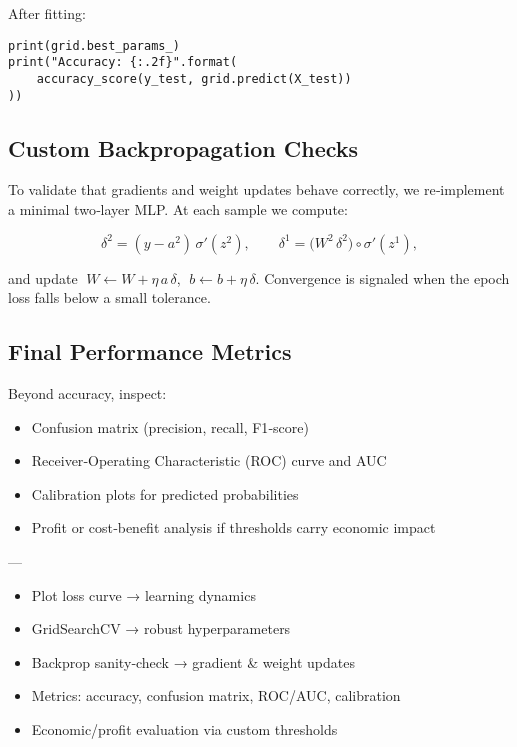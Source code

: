 After fitting:
\begin{verbatim}
print(grid.best_params_)
print("Accuracy: {:.2f}".format(
    accuracy_score(y_test, grid.predict(X_test))
))
\end{verbatim}

\subsection{Custom Backpropagation Checks}

To validate that gradients and weight updates behave correctly, we re‐implement a minimal two‐layer MLP.  At each sample we compute:



\[
\delta^2 = (y - a^2)\,\sigma'(z^2), 
\qquad
\delta^1 = \bigl(W^2\,\delta^2\bigr)\circ\sigma'(z^1),
\]


and update  
\(\;W \gets W + \eta\,a\,\delta\),  
\(\;b \gets b + \eta\,\delta\).  
Convergence is signaled when the epoch loss falls below a small tolerance.

\subsection{Final Performance Metrics}

Beyond accuracy, inspect:
\begin{itemize}
  \item Confusion matrix (precision, recall, F1‐score)
  \item Receiver‐Operating Characteristic (ROC) curve and AUC
  \item Calibration plots for predicted probabilities
  \item Profit or cost‐benefit analysis if thresholds carry economic impact
\end{itemize}

---

\begin{itemize}
  \item Plot loss curve → learning dynamics
  \item GridSearchCV → robust hyperparameters
  \item Backprop sanity‐check → gradient & weight updates
  \item Metrics: accuracy, confusion matrix, ROC/AUC, calibration
  \item Economic/profit evaluation via custom thresholds
\end{itemize}


